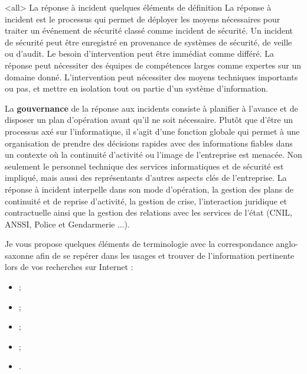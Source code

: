\mode<all>{\texframe
{La réponse à incident}
{quelques éléments de définition}
{%
La réponse à incident est le processus qui permet de déployer les moyens nécessaires pour traiter un événement de sécurité classé comme incident de sécurité.
Un incident de sécurité peut être enregistré en provenance de systèmes de sécurité, de veille ou d'audit. Le besoin d'intervention peut être immédiat comme différé.
La réponse peut nécessiter des équipes de compétences larges comme expertes sur un domaine donné. L'intervention peut nécessiter des moyens techniques importants ou pas, et mettre en isolation tout ou partie d'un système d'information.
}} %


La \textbf{gouvernance} de la réponse aux incidents consiste à planifier à l'avance et  de disposer un plan d'opération avant qu'il ne soit nécessaire. Plutôt que d'être un processus axé sur l'informatique, il s'agit d'une fonction  globale qui permet à une organisation de prendre des décisions rapides avec des informations fiables dans un contexte où la continuité d'activité ou l'image de l'entreprise est menacée. Non seulement le personnel technique des services informatiques et de sécurité est impliqué, mais aussi des représentants d'autres aspects clés de l'entreprise. La réponse à incident  interpelle  dans son mode d'opération, la gestion des plans de continuité et de reprise d'activité, la gestion de crise,  l'interaction juridique et contractuelle  ainsi que la gestion des relations avec les services de l'état (CNIL, ANSSI, Police et Gendarmerie ...). 

Je vous propose quelques éléments de terminologie avec la correspondance anglo-saxonne afin de se repérer dans les usages et trouver de l'information pertinente lors de vos recherches sur Internet :

\begin{itemize}
		\item {};
		\item{};
		\item {};
		\item {};
		\item {}.
\end{itemize}

